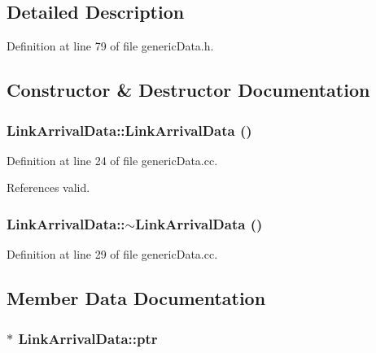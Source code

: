 \subsection{Detailed Description}


Definition at line 79 of file genericData.h.

\subsection{Constructor \& Destructor Documentation}
\subsubsection[{LinkArrivalData}]{\setlength{\rightskip}{0pt plus 5cm}LinkArrivalData::LinkArrivalData ()}\label{classLinkArrivalData_68c73d0d5ad8327bd3d58c82fa5fcef6}




Definition at line 24 of file genericData.cc.

References valid.
\subsubsection[{$\sim$LinkArrivalData}]{\setlength{\rightskip}{0pt plus 5cm}LinkArrivalData::$\sim$LinkArrivalData ()}\label{classLinkArrivalData_925ca0d6244e409041fd3133efe18ed4}




Definition at line 29 of file genericData.cc.

\subsection{Member Data Documentation}
\subsubsection[{ptr}]{$\ast$ {\bf LinkArrivalData::ptr}}\label{classLinkArrivalData_36be2b58e0fcc9f9f98143d67c43e69a}




